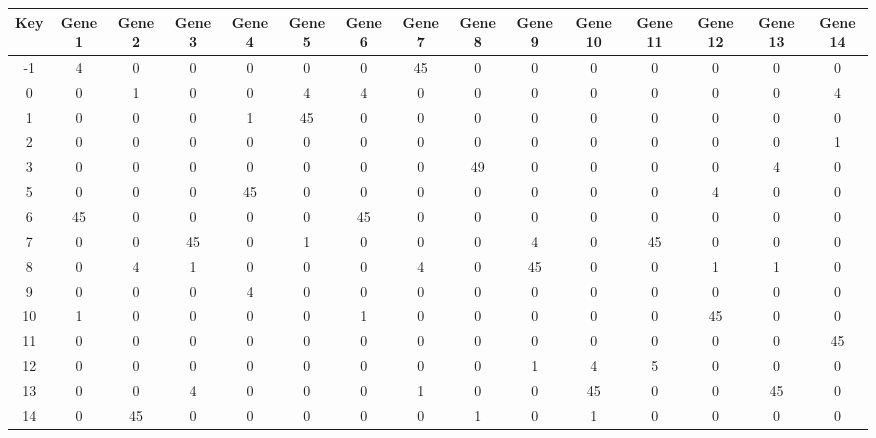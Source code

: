 \begin{tabular}{|c|c|c|c|c|c|c|c|c|c|c|c|c|c|c|}
\hline
Key & Gene 1 & Gene 2 & Gene 3 & Gene 4 & Gene 5 & Gene 6 & Gene 7 & Gene 8 & Gene 9 & Gene 10 & Gene 11 & Gene 12 & Gene 13 & Gene 14 \\
\hline
-1 & 4 & 0 & 0 & 0 & 0 & 0 & 45 & 0 & 0 & 0 & 0 & 0 & 0 & 0 \\
0 & 0 & 1 & 0 & 0 & 4 & 4 & 0 & 0 & 0 & 0 & 0 & 0 & 0 & 4 \\
1 & 0 & 0 & 0 & 1 & 45 & 0 & 0 & 0 & 0 & 0 & 0 & 0 & 0 & 0 \\
2 & 0 & 0 & 0 & 0 & 0 & 0 & 0 & 0 & 0 & 0 & 0 & 0 & 0 & 1 \\
3 & 0 & 0 & 0 & 0 & 0 & 0 & 0 & 49 & 0 & 0 & 0 & 0 & 4 & 0 \\
5 & 0 & 0 & 0 & 45 & 0 & 0 & 0 & 0 & 0 & 0 & 0 & 4 & 0 & 0 \\
6 & 45 & 0 & 0 & 0 & 0 & 45 & 0 & 0 & 0 & 0 & 0 & 0 & 0 & 0 \\
7 & 0 & 0 & 45 & 0 & 1 & 0 & 0 & 0 & 4 & 0 & 45 & 0 & 0 & 0 \\
8 & 0 & 4 & 1 & 0 & 0 & 0 & 4 & 0 & 45 & 0 & 0 & 1 & 1 & 0 \\
9 & 0 & 0 & 0 & 4 & 0 & 0 & 0 & 0 & 0 & 0 & 0 & 0 & 0 & 0 \\
10 & 1 & 0 & 0 & 0 & 0 & 1 & 0 & 0 & 0 & 0 & 0 & 45 & 0 & 0 \\
11 & 0 & 0 & 0 & 0 & 0 & 0 & 0 & 0 & 0 & 0 & 0 & 0 & 0 & 45 \\
12 & 0 & 0 & 0 & 0 & 0 & 0 & 0 & 0 & 1 & 4 & 5 & 0 & 0 & 0 \\
13 & 0 & 0 & 4 & 0 & 0 & 0 & 1 & 0 & 0 & 45 & 0 & 0 & 45 & 0 \\
14 & 0 & 45 & 0 & 0 & 0 & 0 & 0 & 1 & 0 & 1 & 0 & 0 & 0 & 0 \\
\hline
\end{tabular}